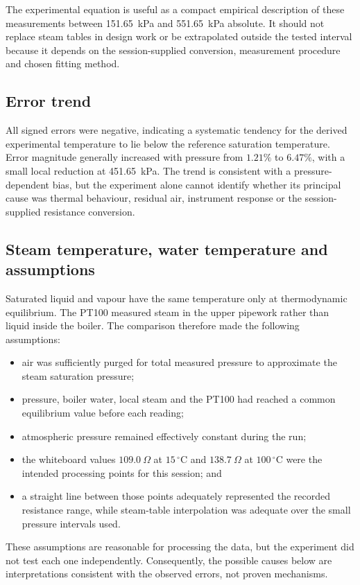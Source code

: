 \documentclass[11pt,a4paper]{article}
\begin{document}
The experimental equation is useful as a compact empirical description of
these measurements between \SI{151.65}{\kilo\pascal} and
\SI{551.65}{\kilo\pascal} absolute. It should not replace steam tables in design
work or be extrapolated outside the tested interval because it depends on the
session-supplied conversion, measurement procedure and chosen fitting method.

\subsection{Error trend}
All signed errors were negative, indicating a systematic tendency for the
derived experimental temperature to lie below the reference saturation
temperature. Error magnitude generally increased with pressure from $1.21\%$
to $6.47\%$, with a small local reduction at \SI{451.65}{\kilo\pascal}. The
trend is consistent with a pressure-dependent bias, but the experiment alone
cannot identify whether its principal cause was thermal behaviour, residual air,
instrument response or the session-supplied resistance conversion.

\subsection{Steam temperature, water temperature and assumptions}
Saturated liquid and vapour have the same temperature only at thermodynamic
equilibrium. The PT100 measured steam in the upper pipework rather than liquid
inside the boiler. The comparison therefore made the following assumptions:
\begin{itemize}
  \item air was sufficiently purged for total measured pressure to approximate
        the steam saturation pressure;
  \item pressure, boiler water, local steam and the PT100 had reached a common
        equilibrium value before each reading;
  \item atmospheric pressure remained effectively constant during the run;
  \item the whiteboard values $109.0~\Omega$ at $15\,{}^\circ\mathrm{C}$ and
        $138.7~\Omega$ at $100\,{}^\circ\mathrm{C}$ were the intended processing
        points for this session; and
  \item a straight line between those points adequately represented the recorded
        resistance range, while steam-table interpolation was adequate over the
        small pressure intervals used.
\end{itemize}
These assumptions are reasonable for processing the data, but the experiment
did not test each one independently. Consequently, the possible causes below
are interpretations consistent with the observed errors, not proven mechanisms.
\end{document}
